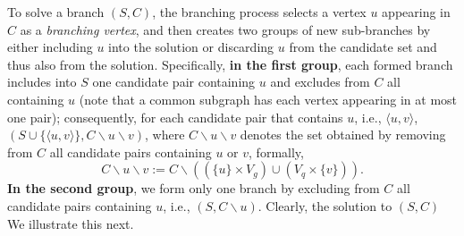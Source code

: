 To solve a branch $(S,C)$, the branching process selects a vertex $u$ {\cheng appearing} in $C$ as a \emph{branching vertex},  and then creates two groups of new sub-branches by either including $u$ into the solution  or discarding $u$ from the candidate set {\Yui and thus also from the solution}.  Specifically, \textbf{in the first group}, each formed branch includes into $S$ one candidate pair containing $u$ and excludes from $C$ all  containing $u$ (note that a common subgraph has each vertex {\cheng appearing} in at most one pair); consequently, for each candidate pair that contains $u$, i.e., $\langle u,v \rangle$,  $(S\cup\{\langle u,v \rangle\}, C\backslash u\backslash v)$,  
%
%
where $C\backslash u\backslash v$ denotes the set obtained by removing from $C$ all  candidate pairs  containing $u$ or $v$, formally,
\begin{equation}
    C\backslash u\backslash v:= C\backslash ((\{u\}\times V_g) \cup ( V_q\times\{v\})).
\end{equation}
%
\textbf{In the second group}, we form only one branch by excluding from $C$ all candidate pairs containing $u$, {\cheng i.e.,} $(S,C\backslash u)$. Clearly,  the solution to  $(S,C)$   We illustrate this next. 
%


